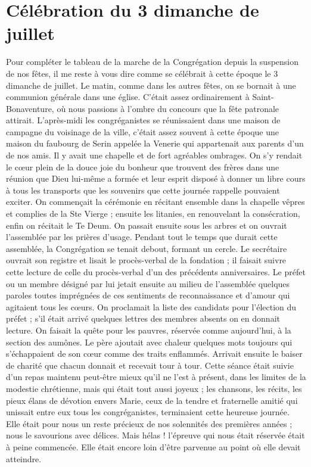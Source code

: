 \section*{Célébration du 3 dimanche de juillet}
Pour compléter le tableau de la marche de la Congrégation depuis la suspension de nos fêtes, il me reste à vous dire comme se célébrait à cette époque le 3 dimanche de juillet. Le matin, comme dans les autres fêtes, on se bornait à une communion générale dans une église. C'était assez ordinairement à Saint-Bonaventure, où nous passions à l'ombre du concours que la fête patronale attirait. L'après-midi les congréganistes se réunissaient dans une maison de campagne du voisinage de la ville, c'était assez souvent à cette époque une maison du faubourg de Serin appelée la Venerie qui appartenait aux parents d'un de nos amis. Il y avait une chapelle et de fort agréables ombrages. On s'y rendait le cœur plein de la douce joie du bonheur que trouvent des frères dans une réunion que Dieu lui-même a formée et leur esprit disposé à donner un libre cours à tous les transports que les souvenirs que cette journée rappelle pouvaient exciter.
On commençait la cérémonie en récitant ensemble dans la chapelle
vêpres et complies de la Ste Vierge ; ensuite les litanies, en renouvelant la consécration, enfin on récitait le Te Deum. On passait ensuite sous les arbres et on ouvrait l'assemblée par les prières d'usage. Pendant tout le temps que durait cette assemblée, la Congrégation se tenait debout, formant un cercle. Le secrétaire ouvrait son registre et lisait le procès-verbal de la fondation ; il faisait suivre cette lecture de celle du procès-verbal d'un des précédents anniversaires. Le préfet ou un membre désigné par lui jetait ensuite au milieu de l'assemblée quelques paroles toutes imprégnées de ces sentiments de reconnaissance et d'amour qui agitaient tous les cœurs. On proclamait la liste des candidats pour l'élection du préfet ; s'il était arrivé quelques lettres des membres absents on en donnait lecture. On faisait la quête pour les pauvres, réservée comme aujourd'hui, à la section des aumônes. Le père ajoutait avec chaleur quelques mots toujours qui s'échappaient de son cœur comme des traits enflammés. Arrivait ensuite le baiser de charité que chacun donnait et recevait tour à tour. Cette séance était suivie d'un repas maintenu peut-être mieux qu'il ne l'est à présent, dans les limites de la modestie chrétienne, mais qui était tout aussi joyeux ; les chansons, les récits, les pieux élans de dévotion envers Marie, ceux de la tendre et fraternelle amitié qui unissait entre eux tous les congréganistes, terminaient cette heureuse journée. Elle était pour nous un reste précieux de nos solennités des premières années ; nous le savourions avec délices. Mais hélas ! l'épreuve qui nous était réservée était à peine commencée. Elle était encore loin d'être parvenue au point où elle devait atteindre.
